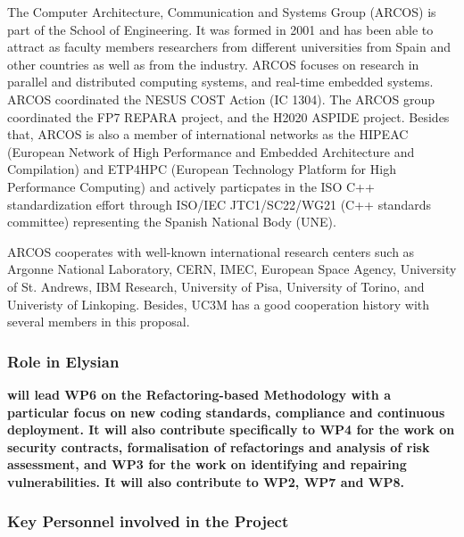 \documentclass[a4paper,11pt]{article}
\begin{document}
The Computer Architecture, Communication and Systems Group (ARCOS) is part of the School of Engineering. It was formed in 2001 and has been able to attract as faculty members researchers from different
universities from Spain and other countries as well as from the industry. ARCOS focuses on research in
parallel and distributed computing systems, and real-time embedded systems. ARCOS coordinated the NESUS COST Action (IC 1304). The ARCOS group coordinated the  FP7 REPARA project, and the H2020 ASPIDE project. Besides that, ARCOS is also a member of international networks as the HIPEAC (European Network of High Performance and Embedded Architecture and Compilation) and ETP4HPC (European
Technology Platform for High Performance Computing) and actively particpates in the ISO C++ standardization effort through ISO/IEC JTC1/SC22/WG21 (C++ standards committee) representing the Spanish National
Body (UNE).

ARCOS cooperates with well-known international research centers such as Argonne National Laboratory, CERN, IMEC, European Space Agency, University of St. Andrews, IBM Research, University of Pisa, University of Torino, and Univeristy of Linkoping. Besides, UC3M has a good cooperation history with several members in this proposal.

\subsubsection*{Role in Elysian}
\textbf{\UCM will lead WP6 on the Refactoring-based Methodology with a particular focus on new coding standards, compliance and continuous deployment. It will also contribute specifically to WP4 for the work on security contracts, formalisation of refactorings and analysis of risk assessment, and WP3 for the work on identifying and repairing vulnerabilities. It will also contribute to WP2, WP7 and WP8. }



\subsubsection*{Key Personnel involved in the Project}
\end{document}
